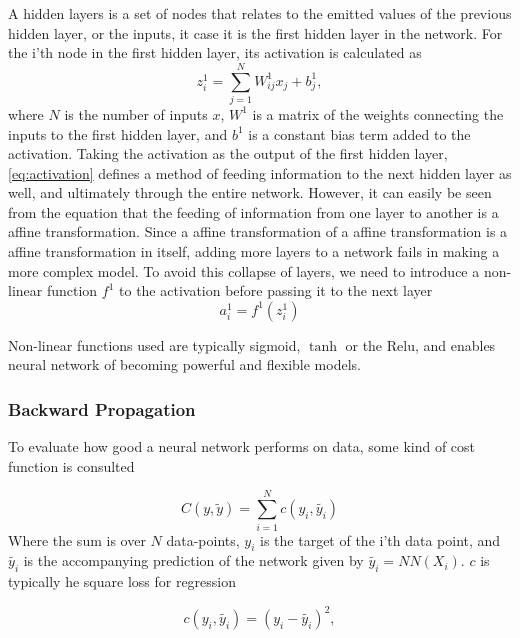 A hidden layers is a set of nodes that relates to the emitted values of the 
previous hidden layer, or the inputs, it case it is the first hidden layer in the 
network. For the i'th node in the first hidden layer, its activation is 
calculated as
\begin{equation}\label{eq:activation}
    z^1_i = \sum_{j=1}^N W^1_{ij}x_j + b^1_j,
\end{equation}
where $N$ is the number of inputs $x$, $W^1$ is a matrix of the weights connecting the inputs to the first hidden layer, and $b^1$ is a constant bias term added to the activation. Taking the activation as the output of the first hidden layer, \autoref{eq:activation} defines a method of feeding information to the next hidden layer as well, and ultimately through the entire network. However, it can easily be seen from the equation that the feeding of information from one layer to another is a affine transformation. Since a affine transformation of a affine transformation is a affine transformation in itself, adding more layers to a network fails in making a more complex model. To avoid this collapse of 
layers, we need to introduce a non-linear function $f^1$ to the activation before 
passing it to the next layer
\begin{equation}\label{eq:non_linear}
    a^1_i = f^1(z^1_i)
\end{equation}

Non-linear functions used are typically sigmoid, $\tanh$ or the Relu, and enables neural network of becoming powerful and flexible models.

\subsubsection{Backward Propagation}
To evaluate how good a neural network performs on data, some kind of 
cost function is consulted

\begin{equation}\label{eq:cost}
    C(y, \tilde{y}) = \sum_{i=1}^N c(y_i, \tilde{y_i}) 
\end{equation}
Where the sum is over $N$ data-points, $y_i$ is the target of the i'th data point,
and $\tilde{y_i}$ is the accompanying prediction of the network given by $\tilde{y_i} = NN(X_i)$. $c$ is typically he square loss for regression

\begin{equation}\label{eq:square_loss}
    c(y_i, \tilde{y_i}) = (y_i - \tilde{y_i})^2,
\end{equation}


